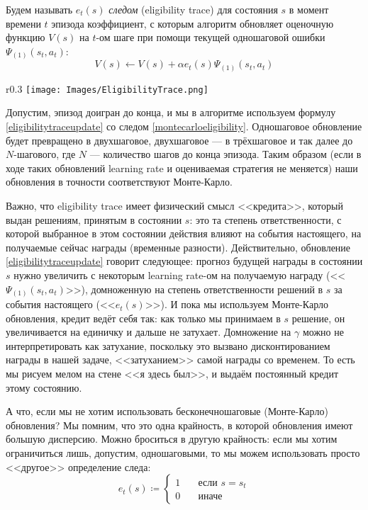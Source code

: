 \begin{definition}
Будем называть $e_t(s)$ \emph{следом} (eligibility trace) для состояния $s$ в момент времени $t$ эпизода коэффициент, с которым алгоритм обновляет оценочную функцию $V(s)$ на $t$-ом шаге при помощи текущей одношаговой ошибки $\Psi_{(1)}(s_t, a_t)$:
\begin{equation}\label{eligibilitytraceupdate}
    V(s) \leftarrow V(s) + \alpha e_t(s) \Psi_{(1)}(s_t, a_t)
\end{equation}
\end{definition}

\begin{wrapfigure}{r}{0.3\textwidth}
\vspace{-0.8cm}
\centering
\texttt{[image: Images/EligibilityTrace.png]}
\vspace{-0.6cm}
\end{wrapfigure}

Допустим, эпизод доигран до конца, и мы в алгоритме используем формулу \eqref{eligibilitytraceupdate} со следом \eqref{montecarloeligibility}. Одношаговое обновление будет превращено в двухшаговое, двухшаговое --- в трёхшаговое и так далее до $N$-шагового, где $N$ --- количество шагов до конца эпизода. Таким образом (если в ходе таких обновлений learning rate и оцениваемая стратегия не меняется) наши обновления в точности соответствуют Монте-Карло.

Важно, что eligibility trace имеет физический смысл <<кредита>>, который выдан решениям, принятым в состоянии $s$: это та степень ответственности, с которой выбранное в этом состоянии действия влияют на события настоящего, на получаемые сейчас награды (временные разности). Действительно, обновление \eqref{eligibilitytraceupdate} говорит следующее: прогноз будущей награды в состоянии $s$ нужно увеличить с некоторым learning rate-ом на получаемую награду (<<$\Psi_{(1)}(s_t, a_t)$>>), домноженную на степень ответственности решений в $s$ за события настоящего (<<$e_t(s)$>>). И пока мы используем Монте-Карло обновления, кредит ведёт себя так: как только мы принимаем в $s$ решение, он увеличивается на единичку и дальше не затухает. Домножение на $\gamma$ можно не интерпретировать как затухание, поскольку это вызвано дисконтированием награды в нашей задаче, <<затуханием>> самой награды со временем. То есть мы рисуем мелом на стене <<я здесь был>>, и выдаём постоянный кредит этому состоянию.

А что, если мы не хотим использовать бесконечношаговые (Монте-Карло) обновления? Мы помним, что это одна крайность, в которой обновления имеют большую дисперсию. Можно броситься в другую крайность: если мы хотим ограничиться лишь, допустим, одношаговыми, то мы можем использовать просто <<другое>> определение следа:
$$e_t(s) \coloneqq \begin{cases}
1 \quad & \text{если } s = s_t \\
0 \quad & \text{иначе}
\end{cases}$$

